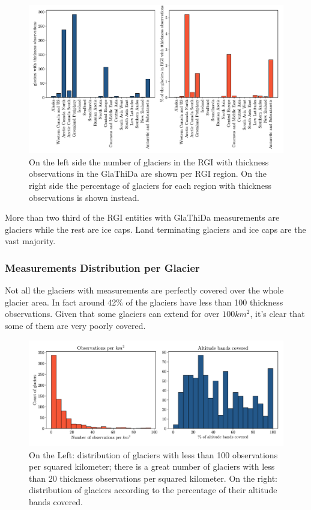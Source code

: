 \begin{figure}[!tp]
	\centering		  
	\includegraphics[width=1.\textwidth]{figures/Observations_per_region.pdf}
	\caption{On the left side the number of glaciers in the RGI with thickness observations in the GlaThiDa are shown per RGI region. On the right side the percentage of glaciers for each region with thickness observations is shown instead.}
	\label{fig:glareg}
\end{figure}

More than two third of the RGI entities with GlaThiDa measurements are glaciers while the rest are ice caps. Land terminating glaciers and ice caps are the vast majority.

\subsubsection{Measurements Distribution per Glacier}
Not all the glaciers with measurements are perfectly covered over the whole glacier area. In fact around 42\% of the glaciers have less than 100 thickness observations. Given that some glaciers can extend for over $100 km^2$, it’s clear that some of them are very poorly covered.
\begin{figure}[!bp]
	\centering		  
	\includegraphics[width=1.\textwidth]{figures/Observations_per_skm.pdf}
	\caption{On the Left: distribution of glaciers with less than 100 observations per squared kilometer; there is a great number of glaciers with less than 20 thickness observations per squared kilometer. On the right: distribution of glaciers according to the percentage of their altitude bands covered.}
	\label{fig:glaobs}
\end{figure}

